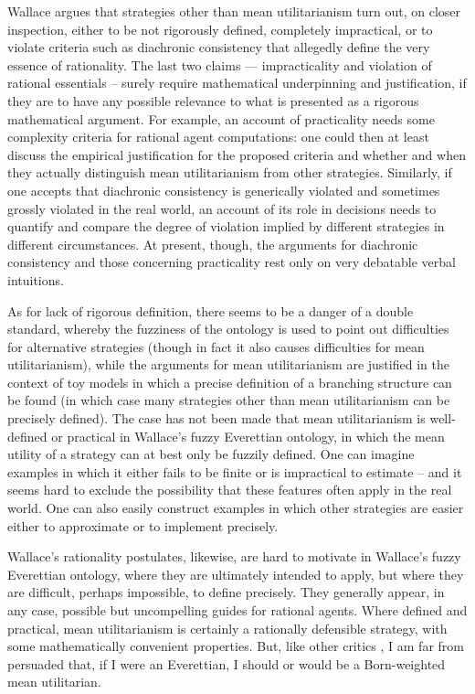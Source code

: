 \documentclass[aps,
pra,epsfig,12pt,nofootinbib]{revtex4}
\begin{document}
Wallace argues that strategies other than
mean utilitarianism turn out, on closer inspection,
either to be not rigorously defined, completely impractical, or to violate
criteria such as diachronic consistency that allegedly define 
the very essence of rationality.  
The last two claims --- impracticality and violation of rational
essentials -- surely require mathematical underpinning and 
justification, if they are to have any possible relevance 
to what is presented as a rigorous
mathematical argument.   For example, an account of practicality  
needs some complexity criteria for rational agent
computations: one could then at least discuss the 
empirical justification for the proposed criteria and 
whether and when they actually distinguish
mean utilitarianism from other strategies.  
Similarly, if one accepts that diachronic consistency is 
generically violated and sometimes grossly
violated in the real world, an account of its role in decisions
needs to quantify and compare the degree of violation implied
by different strategies in different circumstances.  
At present, though, the arguments for diachronic consistency and
those concerning practicality rest only
on very debatable verbal intuitions.

As for lack of rigorous definition, there seems to be a danger of a double 
standard, whereby the fuzziness of the ontology is 
used to point out difficulties for alternative strategies (though
in fact it also causes difficulties for mean utilitarianism), while the 
arguments for mean utilitarianism are justified in the context of toy models 
in which a precise definition of a branching structure can be 
found (in which case many strategies other than mean utilitarianism
can be precisely defined).       
The case has not been made that mean utilitarianism is 
well-defined or practical in Wallace's fuzzy Everettian ontology, in which
the mean utility of a strategy can at best only be fuzzily defined.
One can imagine examples in which it either fails to be finite 
or is impractical to estimate -- and it 
seems hard to exclude the possibility that these features often
apply in the real world.  One can also easily 
construct examples in which other strategies are
easier either to approximate or to implement precisely.  
 
Wallace's rationality postulates, likewise, are hard to motivate
in Wallace's fuzzy Everettian ontology, where
they are ultimately intended to apply, but where they are 
difficult, perhaps impossible, to define precisely.  
They generally appear, in any case, possible but uncompelling
guides for rational agents.   Where defined and practical, mean 
utilitarianism is certainly a rationally defensible strategy, with 
some mathematically convenient properties.  But, like 
other critics \cite{pricevol, albertvol}, I am far from persuaded 
that, if I were an Everettian, I should or would be a Born-weighted mean utilitarian.  
\end{document}
